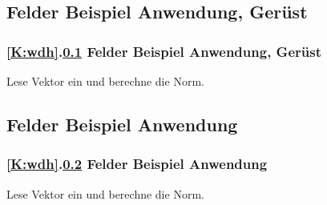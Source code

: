 \def\stitle{Felder Beispiel Anwendung, Ger\"ust}
\subsection{\stitle}\label{S:BeispielG}
\begin{frame}[t]%
  \frametitle{\ref{K:wdh}.\ref{S:BeispielG} \stitle}


Lese Vektor ein und berechne die Norm.


\end{frame}


\def\stitle{Felder Beispiel Anwendung}
\subsection{\stitle}\label{S:Beispiel}
\begin{frame}[t]%
  \frametitle{\ref{K:wdh}.\ref{S:Beispiel} \stitle}

Lese Vektor ein und berechne die Norm.


\end{frame}
